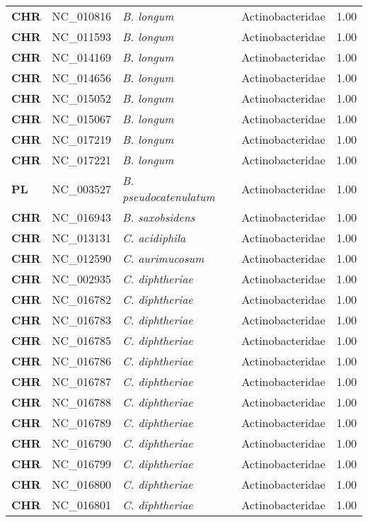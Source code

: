 \begin{adjustwidth}{-3cm}{2cm}
{\begin{supertabular}{>{\bfseries}l|p{0.1\textwidth}p{0.14\textwidth}l|l}
CHR & NC\_010816 & \textit{B. longum} & Actinobacteridae & 1.00\\
CHR & NC\_011593 & \textit{B. longum} & Actinobacteridae & 1.00\\
CHR & NC\_014169 & \textit{B. longum} & Actinobacteridae & 1.00\\
CHR & NC\_014656 & \textit{B. longum} & Actinobacteridae & 1.00\\
CHR & NC\_015052 & \textit{B. longum} & Actinobacteridae & 1.00\\
CHR & NC\_015067 & \textit{B. longum} & Actinobacteridae & 1.00\\
CHR & NC\_017219 & \textit{B. longum} & Actinobacteridae & 1.00\\
CHR & NC\_017221 & \textit{B. longum} & Actinobacteridae & 1.00\\
PL & NC\_003527 & \textit{B. pseudocatenulatum} & Actinobacteridae & 1.00\\
CHR & NC\_016943 & \textit{B. saxobsidens} & Actinobacteridae & 1.00\\
CHR & NC\_013131 & \textit{C. acidiphila} & Actinobacteridae & 1.00\\
CHR & NC\_012590 & \textit{C. aurimucosum} & Actinobacteridae & 1.00\\
CHR & NC\_002935 & \textit{C. diphtheriae} & Actinobacteridae & 1.00\\
CHR & NC\_016782 & \textit{C. diphtheriae} & Actinobacteridae & 1.00\\
CHR & NC\_016783 & \textit{C. diphtheriae} & Actinobacteridae & 1.00\\
CHR & NC\_016785 & \textit{C. diphtheriae} & Actinobacteridae & 1.00\\
CHR & NC\_016786 & \textit{C. diphtheriae} & Actinobacteridae & 1.00\\
CHR & NC\_016787 & \textit{C. diphtheriae} & Actinobacteridae & 1.00\\
CHR & NC\_016788 & \textit{C. diphtheriae} & Actinobacteridae & 1.00\\
CHR & NC\_016789 & \textit{C. diphtheriae} & Actinobacteridae & 1.00\\
CHR & NC\_016790 & \textit{C. diphtheriae} & Actinobacteridae & 1.00\\
CHR & NC\_016799 & \textit{C. diphtheriae} & Actinobacteridae & 1.00\\
CHR & NC\_016800 & \textit{C. diphtheriae} & Actinobacteridae & 1.00\\
CHR & NC\_016801 & \textit{C. diphtheriae} & Actinobacteridae & 1.00\\

\end{supertabular}}
\end{adjustwidth}
